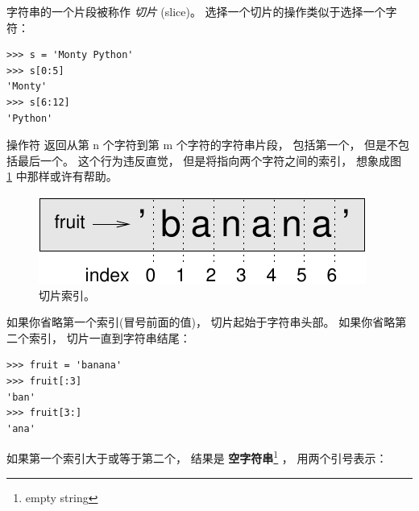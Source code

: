 
字符串的一个片段被称作 {\em 切片} (slice)。  选择一个切片的操作类似于选择一个字符：

\begin{lstlisting}
>>> s = 'Monty Python'
>>> s[0:5]
'Monty'
>>> s[6:12]
'Python'
\end{lstlisting}

%

操作符 \li{[n:m]} 返回从第 n 个字符到第 m 个字符的字符串片段， 包括第一个， 但是不包括最后一个。  这个行为违反直觉， 但是将指向两个字符之间的索引， 想象成图~ \ref{fig.banana} 中那样或许有帮助。

\begin{figure}
\centerline
{\includegraphics[scale=0.9]{../source/figs/banana.pdf}}
\caption{切片索引。  }
\label{fig.banana}
\end{figure}


如果你省略第一个索引(冒号前面的值)， 切片起始于字符串头部。  如果你省略第二个索引， 切片一直到字符串结尾：

\begin{lstlisting}
>>> fruit = 'banana'
>>> fruit[:3]
'ban'
>>> fruit[3:]
'ana'
\end{lstlisting}

%

如果第一个索引大于或等于第二个， 结果是 {\bf 空字符串}\footnote{empty string} ， 用两个引号表示：

